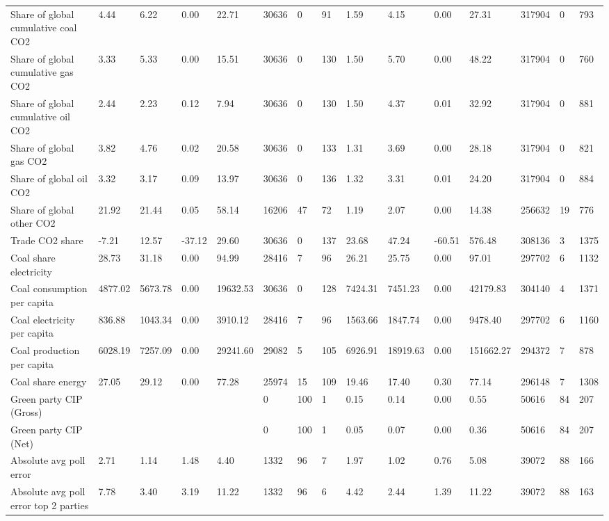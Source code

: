 \begin{longtable}{lllllllllllllll}
Share of global cumulative coal CO2 & 4.44 & 6.22 & 0.00 & 22.71 & 30636 & 0 & 91 & 1.59 & 4.15 & 0.00 & 27.31 & 317904 & 0 & 793\\
Share of global cumulative gas CO2 & 3.33 & 5.33 & 0.00 & 15.51 & 30636 & 0 & 130 & 1.50 & 5.70 & 0.00 & 48.22 & 317904 & 0 & 760\\
Share of global cumulative oil CO2 & 2.44 & 2.23 & 0.12 & 7.94 & 30636 & 0 & 130 & 1.50 & 4.37 & 0.01 & 32.92 & 317904 & 0 & 881\\
\addlinespace
Share of global gas CO2 & 3.82 & 4.76 & 0.02 & 20.58 & 30636 & 0 & 133 & 1.31 & 3.69 & 0.00 & 28.18 & 317904 & 0 & 821\\
Share of global oil CO2 & 3.32 & 3.17 & 0.09 & 13.97 & 30636 & 0 & 136 & 1.32 & 3.31 & 0.01 & 24.20 & 317904 & 0 & 884\\
Share of global other CO2 & 21.92 & 21.44 & 0.05 & 58.14 & 16206 & 47 & 72 & 1.19 & 2.07 & 0.00 & 14.38 & 256632 & 19 & 776\\
Trade CO2 share & -7.21 & 12.57 & -37.12 & 29.60 & 30636 & 0 & 137 & 23.68 & 47.24 & -60.51 & 576.48 & 308136 & 3 & 1375\\
Coal share electricity & 28.73 & 31.18 & 0.00 & 94.99 & 28416 & 7 & 96 & 26.21 & 25.75 & 0.00 & 97.01 & 297702 & 6 & 1132\\
\addlinespace
Coal consumption per capita & 4877.02 & 5673.78 & 0.00 & 19632.53 & 30636 & 0 & 128 & 7424.31 & 7451.23 & 0.00 & 42179.83 & 304140 & 4 & 1371\\
Coal electricity per capita & 836.88 & 1043.34 & 0.00 & 3910.12 & 28416 & 7 & 96 & 1563.66 & 1847.74 & 0.00 & 9478.40 & 297702 & 6 & 1160\\
Coal production per capita & 6028.19 & 7257.09 & 0.00 & 29241.60 & 29082 & 5 & 105 & 6926.91 & 18919.63 & 0.00 & 151662.27 & 294372 & 7 & 878\\
Coal share energy & 27.05 & 29.12 & 0.00 & 77.28 & 25974 & 15 & 109 & 19.46 & 17.40 & 0.30 & 77.14 & 296148 & 7 & 1308\\
Green party CIP (Gross) &  &  &  &  & 0 & 100 & 1 & 0.15 & 0.14 & 0.00 & 0.55 & 50616 & 84 & 207\\
\addlinespace
Green party CIP (Net) &  &  &  &  & 0 & 100 & 1 & 0.05 & 0.07 & 0.00 & 0.36 & 50616 & 84 & 207\\
Absolute avg poll error & 2.71 & 1.14 & 1.48 & 4.40 & 1332 & 96 & 7 & 1.97 & 1.02 & 0.76 & 5.08 & 39072 & 88 & 166\\
Absolute avg poll error top 2 parties & 7.78 & 3.40 & 3.19 & 11.22 & 1332 & 96 & 6 & 4.42 & 2.44 & 1.39 & 11.22 & 39072 & 88 & 163\\

\end{longtable}
